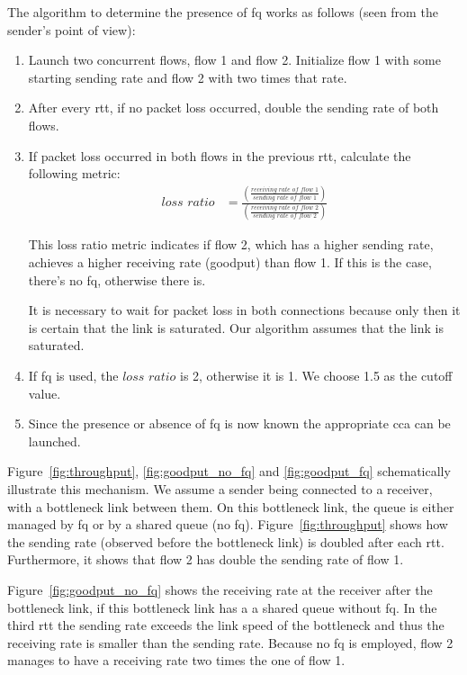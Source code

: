 \documentclass[runningheads]{llncs}
\newcommand{\mynote}[3]{
    \fbox{\bfseries\sffamily\scriptsize#1}
    {\small$\blacktriangleright$\textsf{\emph{\color{#3}{#2}}}$\blacktriangleleft$}}
\newcommand{\noteMax}[1]{\mynote{Max}{#1}{green}}
\begin{document}
The algorithm to determine the presence of \gls{fq} works as follows (seen from the sender's point of view):
\begin{enumerate}
\item Launch two concurrent flows, flow 1 and flow 2. Initialize flow 1 with some starting sending rate and flow 2 with two times that rate. 
\item After every \gls{rtt}, if no packet loss occurred, double the sending rate of both flows. 
\item If packet loss occurred in both flows in the previous \gls{rtt}, calculate the following metric: 
\begin{align}
\textit{loss ratio} &= \frac{\left(\frac{\textit{receiving rate of flow 1}}{\textit{sending rate of flow 1}}\right)}{\left(\frac{\textit{receiving rate of flow 2}}{\textit{sending rate of flow 2}}\right)}\end{align}

This loss ratio metric indicates if flow 2, which has a higher sending rate, achieves a higher receiving rate (goodput) than flow 1. If this is the case, there's no \gls{fq}, otherwise there is. 

It is necessary to wait for packet loss in both connections because only then it is certain that the link is saturated. Our algorithm assumes that the link is saturated. 
\item If \gls{fq} is used, the $\textit{loss ratio}$ is 2, otherwise it is 1. We choose 1.5 as the cutoff value. 
\item Since the presence or absence of \gls{fq} is now known the appropriate \gls{cca} can be launched. 
\end{enumerate}

Figure~\ref{fig:throughput}, \ref{fig:goodput_no_fq} and \ref{fig:goodput_fq} schematically illustrate this mechanism. We assume a sender being connected to a receiver, with a bottleneck link between them. On this bottleneck link, the queue is either managed by \gls{fq} or by a shared queue (no \gls{fq}). Figure~\ref{fig:throughput} shows how the sending rate (observed before the bottleneck link) is doubled after each \gls{rtt}. Furthermore, it shows that flow 2 has double the sending rate of flow 1. %

Figure~\ref{fig:goodput_no_fq} shows the receiving rate at the receiver after the bottleneck link, if this bottleneck link has a a shared queue without \gls{fq}. In the third \gls{rtt} the sending rate exceeds the link speed of the bottleneck and thus the receiving rate is smaller than the sending rate. Because no \gls{fq} is employed, flow 2 manages to have a receiving rate two times the one of flow 1. 
\end{document}
